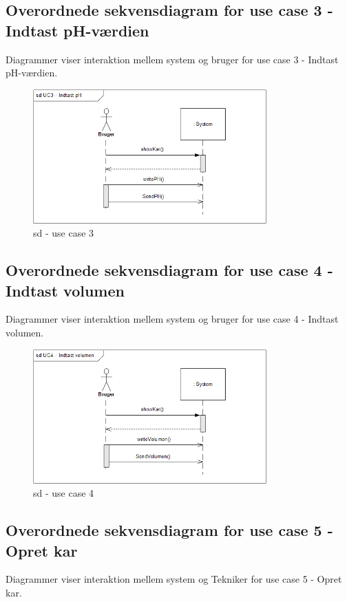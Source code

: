 \subsection{Overordnede sekvensdiagram for use case 3 - Indtast pH-værdien}
Diagrammer viser interaktion mellem system og bruger for use case 3 - Indtast pH-værdien.

\begin{figure}[H]
    \centering
    \includegraphics[width=0.8\textwidth]{Systemarkitektur/OverordnedeSekvensdiagrammer/sd_UC3.PNG}
    \caption{sd - use case 3}
    \label{fig:sd_UC3}
\end{figure}

\subsection{Overordnede sekvensdiagram for use case 4 - Indtast volumen}
Diagrammer viser interaktion mellem system og bruger for use case 4 - Indtast volumen.

\begin{figure}[H]
    \centering
    \includegraphics[width=0.8\textwidth]{Systemarkitektur/OverordnedeSekvensdiagrammer/sd_UC4.PNG}
    \caption{sd - use case 4}
    \label{fig:sd_UC4}
\end{figure}

\subsection{Overordnede sekvensdiagram for use case 5 - Opret kar}
Diagrammer viser interaktion mellem system og Tekniker for use case 5 - Opret kar.

